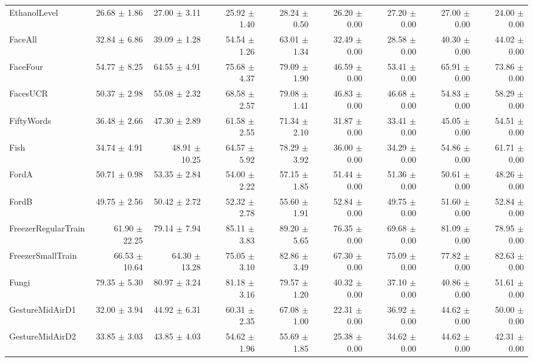 \begin{landscape}
\begin{longtable}{lrrrrrrrr}
EthanolLevel & 26.68 $\pm$ 1.86 & 27.00 $\pm$ 3.11 & 25.92 $\pm$ 1.40 & 28.24 $\pm$ 0.50 & 26.20 $\pm$ 0.00 & 27.20 $\pm$ 0.00 & 27.00 $\pm$ 0.00 & 24.00 $\pm$ 0.00 \\
FaceAll & 32.84 $\pm$ 6.86 & 39.09 $\pm$ 1.28 & 54.54 $\pm$ 1.26 & 63.01 $\pm$ 1.34 & 32.49 $\pm$ 0.00 & 28.58 $\pm$ 0.00 & 40.30 $\pm$ 0.00 & 44.02 $\pm$ 0.00 \\
FaceFour & 54.77 $\pm$ 8.25 & 64.55 $\pm$ 4.91 & 75.68 $\pm$ 4.37 & 79.09 $\pm$ 1.90 & 46.59 $\pm$ 0.00 & 53.41 $\pm$ 0.00 & 65.91 $\pm$ 0.00 & 73.86 $\pm$ 0.00 \\
FacesUCR & 50.37 $\pm$ 2.98 & 55.08 $\pm$ 2.32 & 68.58 $\pm$ 2.57 & 79.08 $\pm$ 1.41 & 46.83 $\pm$ 0.00 & 46.68 $\pm$ 0.00 & 54.83 $\pm$ 0.00 & 58.29 $\pm$ 0.00 \\
FiftyWords & 36.48 $\pm$ 2.66 & 47.30 $\pm$ 2.89 & 61.58 $\pm$ 2.55 & 71.34 $\pm$ 2.10 & 31.87 $\pm$ 0.00 & 33.41 $\pm$ 0.00 & 45.05 $\pm$ 0.00 & 54.51 $\pm$ 0.00 \\
Fish & 34.74 $\pm$ 4.91 & 48.91 $\pm$ 10.25 & 64.57 $\pm$ 5.92 & 78.29 $\pm$ 3.92 & 36.00 $\pm$ 0.00 & 34.29 $\pm$ 0.00 & 54.86 $\pm$ 0.00 & 61.71 $\pm$ 0.00 \\
FordA & 50.71 $\pm$ 0.98 & 53.35 $\pm$ 2.84 & 54.00 $\pm$ 2.22 & 57.15 $\pm$ 1.85 & 51.44 $\pm$ 0.00 & 51.36 $\pm$ 0.00 & 50.61 $\pm$ 0.00 & 48.26 $\pm$ 0.00 \\
FordB & 49.75 $\pm$ 2.56 & 50.42 $\pm$ 2.72 & 52.32 $\pm$ 2.78 & 55.60 $\pm$ 1.91 & 52.84 $\pm$ 0.00 & 49.75 $\pm$ 0.00 & 51.60 $\pm$ 0.00 & 52.84 $\pm$ 0.00 \\
FreezerRegularTrain & 61.90 $\pm$ 22.25 & 79.14 $\pm$ 7.94 & 85.11 $\pm$ 3.83 & 89.20 $\pm$ 5.65 & 76.35 $\pm$ 0.00 & 69.68 $\pm$ 0.00 & 81.09 $\pm$ 0.00 & 78.95 $\pm$ 0.00 \\
FreezerSmallTrain & 66.53 $\pm$ 10.64 & 64.30 $\pm$ 13.28 & 75.05 $\pm$ 3.10 & 82.86 $\pm$ 3.49 & 67.30 $\pm$ 0.00 & 75.09 $\pm$ 0.00 & 77.82 $\pm$ 0.00 & 82.63 $\pm$ 0.00 \\
Fungi & 79.35 $\pm$ 5.30 & 80.97 $\pm$ 3.24 & 81.18 $\pm$ 3.16 & 79.57 $\pm$ 1.20 & 40.32 $\pm$ 0.00 & 37.10 $\pm$ 0.00 & 40.86 $\pm$ 0.00 & 51.61 $\pm$ 0.00 \\
GestureMidAirD1 & 32.00 $\pm$ 3.94 & 44.92 $\pm$ 6.31 & 60.31 $\pm$ 2.35 & 67.08 $\pm$ 1.00 & 22.31 $\pm$ 0.00 & 36.92 $\pm$ 0.00 & 44.62 $\pm$ 0.00 & 50.00 $\pm$ 0.00 \\
GestureMidAirD2 & 33.85 $\pm$ 3.03 & 43.85 $\pm$ 4.03 & 54.62 $\pm$ 1.96 & 55.69 $\pm$ 1.85 & 25.38 $\pm$ 0.00 & 34.62 $\pm$ 0.00 & 44.62 $\pm$ 0.00 & 42.31 $\pm$ 0.00 \\

\end{longtable}
\end{landscape}
